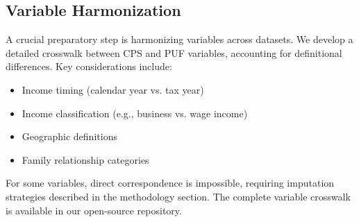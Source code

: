 \subsection{Variable Harmonization}

A crucial preparatory step is harmonizing variables across datasets. We develop a detailed crosswalk between CPS and PUF variables, accounting for definitional differences. Key considerations include:
\begin{itemize}
    \item Income timing (calendar year vs. tax year)
    \item Income classification (e.g., business vs. wage income)
    \item Geographic definitions
    \item Family relationship categories
\end{itemize}

For some variables, direct correspondence is impossible, requiring imputation strategies described in the methodology section. The complete variable crosswalk is available in our open-source repository.
